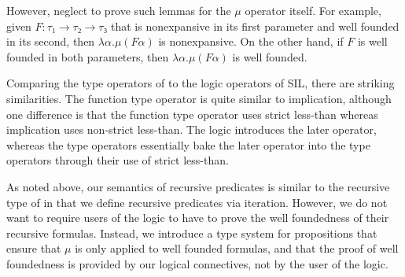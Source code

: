However, \citet{Appel:2001aa} neglect to prove such lemmas for the $μ$
operator itself. For example, given $F : τ₁ → τ₂ → τ₃$ that is
nonexpansive in its first parameter and well founded in its second,
then $λ α. μ (F α)$ is nonexpansive.  On the other hand, if $F$ is
well founded in both parameters, then $λ α. μ (F α)$ is well founded.

Comparing the type operators of \citet{Appel:2001aa} to the logic
operators of SIL, there are striking similarities. The function type
operator is quite similar to implication, although one difference is
that the function type operator uses strict less-than whereas
implication uses non-strict less-than. The logic introduces the later
operator, whereas the type operators essentially bake the later
operator into the type operators through their use of strict
less-than.

As noted above, our semantics of recursive predicates is similar to
the recursive type of \citet{Appel:2001aa} in that we define recursive
predicates via iteration.
%
However, we do not want to require users of the logic to have to prove
the well foundedness of their recursive formulas.  Instead, we
introduce a type system for propositions that ensure that $μ$ is only
applied to well founded formulas, and that the proof of well
foundedness is provided by our logical connectives, not by the user of
the logic.
